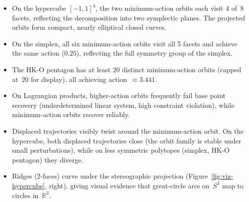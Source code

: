 \begin{itemize}
  \item On the hypercube $[-1,1]^4$, the two minimum-action orbits
    each visit 4 of~8 facets, reflecting the decomposition into
    two symplectic planes.
    The projected orbits form compact, nearly elliptical closed curves.

  \item On the simplex, all six minimum-action orbits visit all
    5 facets and achieve the same action ($0.25$),
    reflecting the full symmetry group of the simplex.

  \item The HK-O pentagon has at least 20 distinct minimum-action
    orbits (capped at~20 for display), all achieving
    action~$\approx 3.441$.

  \item On Lagrangian products, higher-action orbits frequently
    fail base point recovery (underdetermined linear system,
    high constraint violation), while minimum-action orbits
    recover reliably.

  \item Displaced trajectories visibly twist around the
    minimum-action orbit.
    On the hypercube, both displaced trajectories close
    (the orbit family is stable under small perturbations),
    while on less symmetric polytopes (simplex, HK-O pentagon)
    they diverge.

  \item Ridges (2-faces) curve under the stereographic projection
    (Figure~\ref{fig:viz-hypercube}, right),
    giving visual evidence that great-circle arcs on~$S^3$ map to
    circles in~$\mathbb{R}^3$.
\end{itemize}

